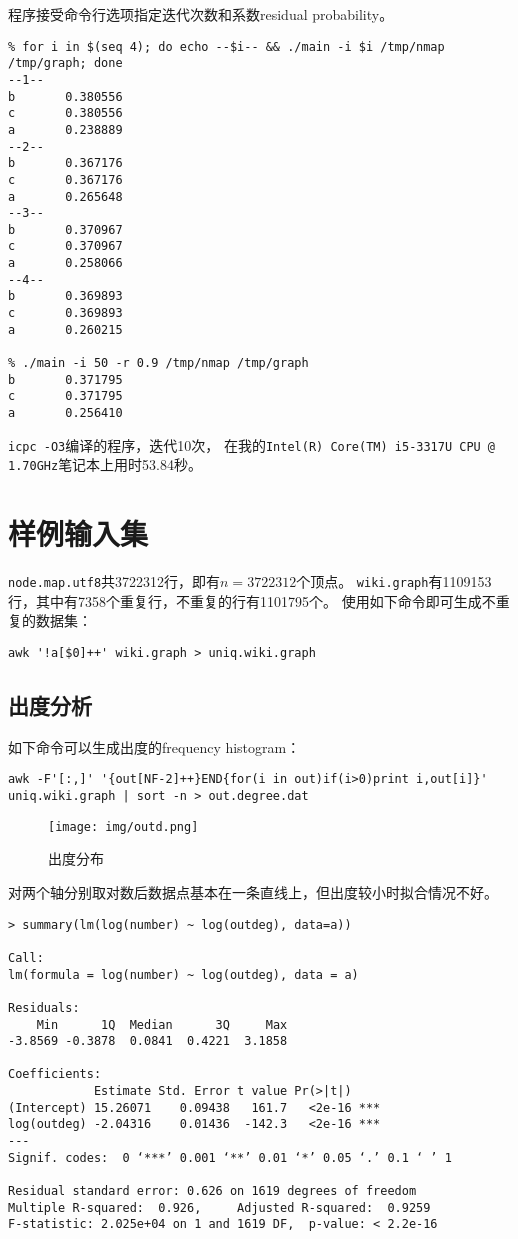 程序接受命令行选项指定迭代次数和系数residual probability。

\begin{verbatim}
% for i in $(seq 4); do echo --$i-- && ./main -i $i /tmp/nmap /tmp/graph; done
--1--
b       0.380556
c       0.380556
a       0.238889
--2--
b       0.367176
c       0.367176
a       0.265648
--3--
b       0.370967
c       0.370967
a       0.258066
--4--
b       0.369893
c       0.369893
a       0.260215

% ./main -i 50 -r 0.9 /tmp/nmap /tmp/graph
b       0.371795
c       0.371795
a       0.256410
\end{verbatim}

\texttt{icpc -O3}编译的程序，迭代10次，
在我的\texttt{Intel(R) Core(TM) i5-3317U CPU @ 1.70GHz}笔记本上用时53.84秒。

\section{样例输入集}

\texttt{node.map.utf8}共3722312行，即有$n=3722312$个顶点。
\texttt{wiki.graph}有1109153行，其中有7358个重复行，不重复的行有1101795个。
使用如下命令即可生成不重复的数据集：

\begin{verbatim}
awk '!a[$0]++' wiki.graph > uniq.wiki.graph
\end{verbatim}

\subsection{出度分析}

如下命令可以生成出度的frequency histogram：

\begin{verbatim}
awk -F'[:,]' '{out[NF-2]++}END{for(i in out)if(i>0)print i,out[i]}' uniq.wiki.graph | sort -n > out.degree.dat
\end{verbatim}

\begin{figure}[H]
  \centering
  \texttt{[image: img/outd.png]}
  \caption{出度分布}
\end{figure}

对两个轴分别取对数后数据点基本在一条直线上，但出度较小时拟合情况不好。

\begin{verbatim}
> summary(lm(log(number) ~ log(outdeg), data=a))

Call:
lm(formula = log(number) ~ log(outdeg), data = a)

Residuals:
    Min      1Q  Median      3Q     Max 
-3.8569 -0.3878  0.0841  0.4221  3.1858 

Coefficients:
            Estimate Std. Error t value Pr(>|t|)    
(Intercept) 15.26071    0.09438   161.7   <2e-16 ***
log(outdeg) -2.04316    0.01436  -142.3   <2e-16 ***
---
Signif. codes:  0 ‘***’ 0.001 ‘**’ 0.01 ‘*’ 0.05 ‘.’ 0.1 ‘ ’ 1

Residual standard error: 0.626 on 1619 degrees of freedom
Multiple R-squared:  0.926,     Adjusted R-squared:  0.9259 
F-statistic: 2.025e+04 on 1 and 1619 DF,  p-value: < 2.2e-16
\end{verbatim}

